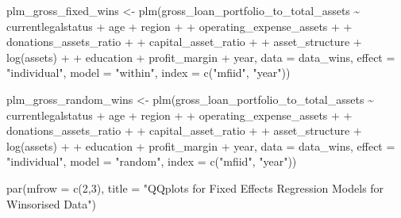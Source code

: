 \documentclass[a4paper,nobind]{templates/ociamthesis}
\newenvironment{Shaded}{\begin{snugshade}}{\end{snugshade}}
\newcommand{\AttributeTok}[1]{\textcolor[rgb]{0.77,0.63,0.00}{#1}}
\newcommand{\DecValTok}[1]{\textcolor[rgb]{0.00,0.00,0.81}{#1}}
\newcommand{\FunctionTok}[1]{\textcolor[rgb]{0.00,0.00,0.00}{#1}}
\newcommand{\NormalTok}[1]{#1}
\newcommand{\OtherTok}[1]{\textcolor[rgb]{0.56,0.35,0.01}{#1}}
\newcommand{\SpecialCharTok}[1]{\textcolor[rgb]{0.00,0.00,0.00}{#1}}
\newcommand{\StringTok}[1]{\textcolor[rgb]{0.31,0.60,0.02}{#1}}
\renewenvironment{Shaded}
{
  \vspace{10pt}%
  \begin{snugshade}%
}{%
  \end{snugshade}%
  \vspace{8pt}%
}
\begin{document}
\begin{landscape}
\begin{Shaded}
\begin{Highlighting}[]
\NormalTok{plm\_gross\_fixed\_wins }\OtherTok{\textless{}{-}} \FunctionTok{plm}\NormalTok{(gross\_loan\_portfolio\_to\_total\_assets }\SpecialCharTok{\textasciitilde{}}\NormalTok{ currentlegalstatus }\SpecialCharTok{+}\NormalTok{ age }\SpecialCharTok{+}\NormalTok{ region }\SpecialCharTok{+}
\SpecialCharTok{+}\NormalTok{           operating\_expense\_assets }\SpecialCharTok{+} 
\SpecialCharTok{+}\NormalTok{           donations\_assets\_ratio }\SpecialCharTok{+} 
\SpecialCharTok{+}\NormalTok{           capital\_asset\_ratio }\SpecialCharTok{+}
\SpecialCharTok{+}\NormalTok{           asset\_structure }\SpecialCharTok{+} \FunctionTok{log}\NormalTok{(assets) }\SpecialCharTok{+} 
\SpecialCharTok{+}\NormalTok{           education }\SpecialCharTok{+}\NormalTok{ profit\_margin }\SpecialCharTok{+}\NormalTok{ year, }
               \AttributeTok{data =}\NormalTok{ data\_wins, }\AttributeTok{effect =} \StringTok{"individual"}\NormalTok{, }\AttributeTok{model =} \StringTok{"within"}\NormalTok{, }
      \AttributeTok{index =} \FunctionTok{c}\NormalTok{(}\StringTok{"mfiid"}\NormalTok{, }\StringTok{"year"}\NormalTok{))}

\NormalTok{plm\_gross\_random\_wins }\OtherTok{\textless{}{-}} \FunctionTok{plm}\NormalTok{(gross\_loan\_portfolio\_to\_total\_assets }\SpecialCharTok{\textasciitilde{}}\NormalTok{ currentlegalstatus }\SpecialCharTok{+}\NormalTok{ age }\SpecialCharTok{+}\NormalTok{ region }\SpecialCharTok{+}
\SpecialCharTok{+}\NormalTok{           operating\_expense\_assets }\SpecialCharTok{+} 
\SpecialCharTok{+}\NormalTok{           donations\_assets\_ratio }\SpecialCharTok{+} 
\SpecialCharTok{+}\NormalTok{           capital\_asset\_ratio }\SpecialCharTok{+}
\SpecialCharTok{+}\NormalTok{           asset\_structure }\SpecialCharTok{+} \FunctionTok{log}\NormalTok{(assets) }\SpecialCharTok{+} 
\SpecialCharTok{+}\NormalTok{           education }\SpecialCharTok{+}\NormalTok{ profit\_margin }\SpecialCharTok{+}\NormalTok{ year, }
               \AttributeTok{data =}\NormalTok{ data\_wins, }\AttributeTok{effect =} \StringTok{"individual"}\NormalTok{, }\AttributeTok{model =} \StringTok{"random"}\NormalTok{, }
      \AttributeTok{index =} \FunctionTok{c}\NormalTok{(}\StringTok{"mfiid"}\NormalTok{, }\StringTok{"year"}\NormalTok{))}


\FunctionTok{par}\NormalTok{(}\AttributeTok{mfrow =} \FunctionTok{c}\NormalTok{(}\DecValTok{2}\NormalTok{,}\DecValTok{3}\NormalTok{), }\AttributeTok{title =} \StringTok{"QQplots for Fixed Effects Regression Models for Winsorised Data"}\NormalTok{)}
\end{Highlighting}
\end{Shaded}


\end{landscape}
\end{document}
